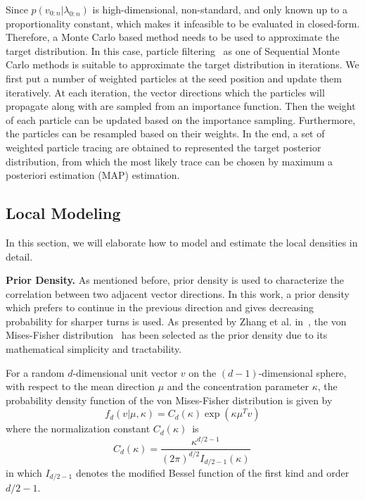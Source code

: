 Since $p({v_{0:n}}|{\lambda_{0:n}})$ is high-dimensional, non-standard, and only known up to a proportionality constant, which makes it infeasible to be evaluated in closed-form. Therefore, a Monte Carlo based method needs to be used to approximate the target distribution. In this case, particle filtering~\cite{doucet2001sequential} as one of Sequential Monte Carlo methods is suitable to approximate the target distribution in iterations. We first put a number of weighted particles at the seed position and update them iteratively. At each iteration, the vector directions which the particles will propagate along with are sampled from an importance function. Then the weight of each particle can be updated based on the importance sampling. Furthermore, the particles can be resampled based on their weights. In the end, a set of weighted particle tracing are obtained to represented the target posterior distribution, from which the most likely trace can be chosen by maximum a posteriori estimation (MAP) estimation.

\subsection{Local Modeling}

In this section, we will elaborate how to model and estimate the local densities in detail.

\noindent\textbf{Prior Density.} As mentioned before, prior density is used to characterize the correlation between two adjacent vector directions. In this work, a prior density which prefers to continue in the previous direction and gives decreasing probability for sharper turns is used. As presented by Zhang et al. in~\cite{Zhang20095}, the von Mises-Fisher distribution~\cite{fisher} has been selected as the prior density due to its mathematical simplicity and tractability.

For a random $d$-dimensional unit vector $v$ on the $(d-1)$-dimensional sphere, with respect to the mean direction $\mu$ and the concentration parameter $\kappa$, the probability density function of the von Mises-Fisher distribution is given by
\begin{equation}
  f_{d}(v| \mu, \kappa)=C_{d}(\kappa)\exp \left( {\kappa \mu^T v } \right)
\end{equation}
where the normalization constant $C_{d}(\kappa)\,$ is
\begin{equation}
  C_{d}(\kappa)=\frac {\kappa^{d/2-1}} {(2\pi)^{d/2}I_{d/2-1}(\kappa)} \,
\end{equation}
in which $I_{d/2-1}$ denotes the modified Bessel function of the first kind and order $d/2-1$.

